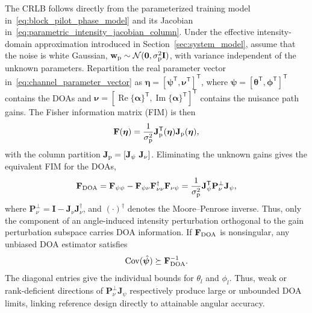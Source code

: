 \documentclass[journal]{IEEEtran}
\begin{document}
The CRLB follows directly from the parameterized training model
in~\eqref{eq:block_pilot_phase_model} and its Jacobian
in~\eqref{eq:parametric_intensity_jacobian_column}. Under the effective
intensity-domain approximation introduced in Section~\ref{sec:system_model},
assume that the noise is white Gaussian,
$\mathbf{w}_{\rm p}\sim\mathcal{N}(\mathbf{0},\sigma_{\rm p}^{2}\mathbf{I})$,
with variance independent of the unknown parameters. Repartition the real
parameter vector in~\eqref{eq:channel_parameter_vector} as
$\boldsymbol{\eta}=[\boldsymbol{\psi}^{\mathsf T},
\boldsymbol{\nu}^{\mathsf T}]^{\mathsf T}$, where
$\boldsymbol{\psi}=[\boldsymbol{\theta}^{\mathsf T},
\boldsymbol{\phi}^{\mathsf T}]^{\mathsf T}$ contains the DOAs and
$\boldsymbol{\nu}=[\operatorname{Re}\{\boldsymbol{\alpha}\}^{\mathsf T},
\operatorname{Im}\{\boldsymbol{\alpha}\}^{\mathsf T}]^{\mathsf T}$ contains
the nuisance path gains. The Fisher information matrix (FIM) is then
\begin{equation}
\mathbf{F}(\boldsymbol{\eta})
=
\frac{1}{\sigma_{\rm p}^{2}}
\mathbf{J}_{\rm p}^{\mathsf T}(\boldsymbol{\eta})
\mathbf{J}_{\rm p}(\boldsymbol{\eta}),
\label{eq:fim_training}
\end{equation}
with the column partition
$\mathbf{J}_{\rm p}=[\mathbf{J}_{\psi}\ \mathbf{J}_{\nu}]$. Eliminating the
unknown gains gives the equivalent FIM for the DOAs,
\begin{equation}
\mathbf{F}_{\rm DOA}
=\mathbf{F}_{\psi\psi}
-\mathbf{F}_{\psi\nu}
\mathbf{F}_{\nu\nu}^{\dagger}
\mathbf{F}_{\nu\psi}
=\frac{1}{\sigma_{\rm p}^{2}}
\mathbf{J}_{\psi}^{\mathsf T}
\mathbf{P}_{\nu}^{\perp}
\mathbf{J}_{\psi},
\label{eq:equivalent_fim_doa}
\end{equation}
where $\mathbf{P}_{\nu}^{\perp}=\mathbf{I}-\mathbf{J}_{\nu}\mathbf{J}_{\nu}^{\dagger}$, and $(\cdot)^{\dagger}$ denotes the Moore--Penrose inverse. Thus, only the
component of an angle-induced intensity perturbation orthogonal to the gain
perturbation subspace carries DOA information. If $\mathbf{F}_{\rm DOA}$ is
nonsingular, any unbiased DOA estimator satisfies
\begin{equation}
\operatorname{Cov}(\hat{\boldsymbol{\psi}})
\succeq
\mathbf{F}_{\rm DOA}^{-1}.
\label{eq:crlb_doa}
\end{equation}
The diagonal entries give the individual bounds for $\theta_l$ and $\phi_l$.
Thus, weak or rank-deficient directions of
$\mathbf P_\nu^\perp\mathbf J_\psi$ respectively produce large or unbounded
DOA limits, linking reference design directly to attainable angular accuracy.
\end{document}
